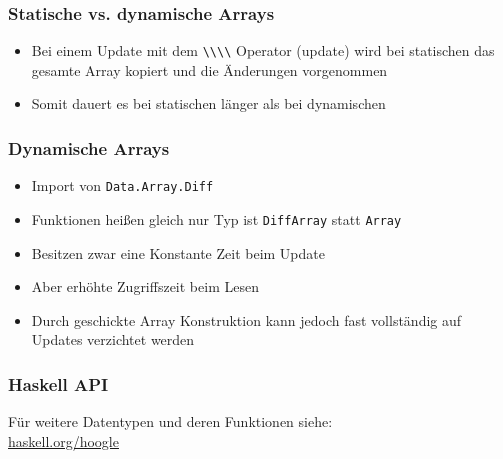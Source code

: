 \documentclass[fleqn,11pt,aspectratio=43]{beamer}
\begin{document}
\begin{frame}
\frametitle{Statische vs. dynamische Arrays}
\begin{block}{\vspace*{-3ex}}
\begin{itemize}
\item Bei einem Update mit dem \lstinline|\\\\| Operator (update) wird bei statischen das gesamte Array kopiert und die Änderungen vorgenommen
\item Somit dauert es bei statischen länger als bei dynamischen
\end{itemize}
\end{block}
\end{frame}

\begin{frame}
\frametitle{Dynamische Arrays}
\begin{block}{\vspace*{-3ex}}
\begin{itemize}
\item Import von \lstinline|Data.Array.Diff|
\item Funktionen heißen gleich nur Typ ist \lstinline|DiffArray| statt \lstinline|Array|
\item Besitzen zwar eine Konstante Zeit beim Update
\item Aber erhöhte Zugriffszeit beim Lesen
\item Durch geschickte Array Konstruktion kann jedoch fast vollständig auf Updates verzichtet werden
\end{itemize}
\end{block}
\end{frame}

\begin{frame}[fragile]
\frametitle{Haskell API}
\begin{block}{\vspace*{-3ex}}
Für weitere Datentypen und deren Funktionen siehe:\\
\url{haskell.org/hoogle}
\end{block}
\end{frame}
\end{document}
